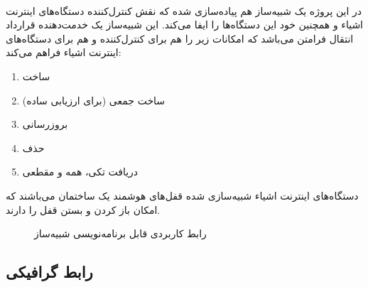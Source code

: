 \paragraph{}
{
    در این پروژه یک شبیه‌ساز هم پیاده‌سازی شده که نقش کنترل‌کننده دستگاه‌های اینترنت اشیاء و همچنین خود این دستگاه‌ها را ایفا می‌کند. این شبیه‌ساز یک خدمت‌دهنده قرارداد انتقال فرامتن می‌باشد که امکانات زیر را هم برای کنترل‌کننده و هم برای دستگاه‌های اینترنت اشیاء فراهم می‌کند:
    \begin{enumerate}
        \item ساخت
        \item ساخت جمعی (برای ارزیابی ساده)
        \item بروزرسانی
        \item حذف
        \item دریافت تکی، همه و مقطعی
    \end{enumerate}
    دستگاه‌های اینترنت اشیاء شبیه‌سازی شده قفل‌های هوشمند یک ساختمان می‌باشند که امکان باز کردن و بستن قفل را دارند.
    \begin{figure}[H]
        \caption{رابط کاربردی قابل برنامه‌نویسی شبیه‌ساز}
        \label{fig:sim_api}
    \end{figure}
}

\subsection{رابط گرافیکی}
\label{subsec:gui}
